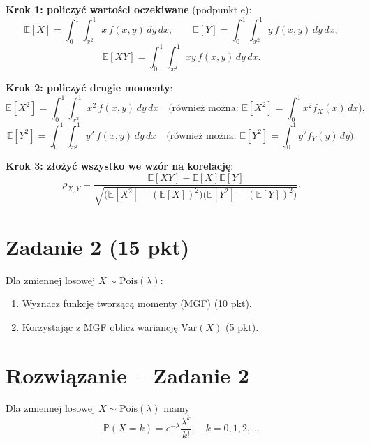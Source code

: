 \documentclass[polish, 10pt]{extarticle}
\begin{document}
\begin{enumerate}
\smallskip
\textbf{Krok 1: policzyć wartości oczekiwane} (podpunkt e):
\[
\mathbb{E}[X]=\int_{0}^{1}\int_{x^2}^{1} x\,f(x,y)\,dy\,dx,
\qquad
\mathbb{E}[Y]=\int_{0}^{1}\int_{x^2}^{1} y\,f(x,y)\,dy\,dx,
\]
\[
\mathbb{E}[XY]=\int_{0}^{1}\int_{x^2}^{1} xy\,f(x,y)\,dy\,dx.
\]

\smallskip
\textbf{Krok 2: policzyć drugie momenty}:
\[
\mathbb{E}[X^2]=\int_{0}^{1}\int_{x^2}^{1} x^2\,f(x,y)\,dy\,dx
\quad\text{(również można: } \mathbb{E}[X^2]=\int_0^1 x^2 f_X(x)\,dx\text{)},
\]
\[
\mathbb{E}[Y^2]=\int_{0}^{1}\int_{x^2}^{1} y^2\,f(x,y)\,dy\,dx
\quad\text{(również można: } \mathbb{E}[Y^2]=\int_0^1 y^2 f_Y(y)\,dy\text{)}.
\]

\smallskip
\textbf{Krok 3: złożyć wszystko we wzór na korelację}:
\[
\rho_{X,Y}
=\frac{\mathbb{E}[XY]-\mathbb{E}[X]\mathbb{E}[Y]}
{\sqrt{\big(\mathbb{E}[X^2]-(\mathbb{E}[X])^2\big)\big(\mathbb{E}[Y^2]-(\mathbb{E}[Y])^2\big)}}.
\]

\end{enumerate}

\section*{Zadanie 2 (15 pkt)}
Dla zmiennej losowej $X\sim \mathrm{Pois}(\lambda)$:
\begin{enumerate}
  \item[a)] Wyznacz funkcję tworzącą momenty (MGF) \hfill (10 pkt).
  \item[b)] Korzystając z MGF oblicz wariancję $\mathrm{Var}(X)$ \hfill (5 pkt).
\end{enumerate}

\section*{Rozwiązanie -- Zadanie 2}

Dla zmiennej losowej $X\sim \mathrm{Pois}(\lambda)$ mamy
\[
\mathbb{P}(X=k)=e^{-\lambda}\frac{\lambda^k}{k!},\quad k=0,1,2,\dots
\]
\end{document}
